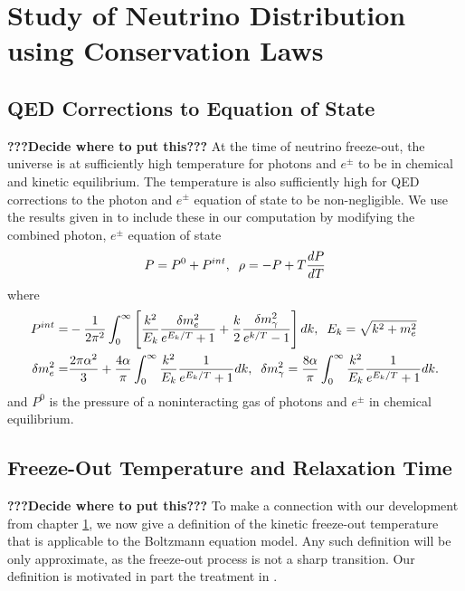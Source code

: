 \section{ Study of Neutrino Distribution using Conservation Laws}\label{ch:model_ind}


\subsection{QED Corrections to Equation of State}\label{app:QED_corr} {\bf???Decide where to put this???}
At the time of neutrino freeze-out, the universe is at sufficiently high temperature for photons and $e^\pm$ to be in chemical and kinetic equilibrium.  The temperature is also sufficiently high for QED corrections to the photon and $e^\pm$ equation of state to be non-negligible.  We use the results given in \cite{Heckler:1994tv,Mangano2002} to include these in our computation by modifying the combined photon, $e^\pm$ equation of state
\begin{align}
P=P^0+P^{int},\hspace{2mm} \rho=-P+T\frac{dP}{dT}
\end{align}
where
\begin{align}
P^{int}=&-\frac{1}{2\pi^2}\int_0^\infty\left[\frac{k^2}{E_k}\frac{\delta m_e^2}{e^{E_k/T}+1}+\frac{k}{2}\frac{\delta m_\gamma^2}{e^{k/T}-1}\right]dk,\hspace{2mm} E_k=\sqrt{k^2+m_e^2}\\
\delta m_e^2=&\frac{2\pi\alpha^2}{3}+\frac{4\alpha}{\pi}\int_0^\infty \frac{k^2}{E_k}\frac{1}{e^{E_k/T}+1}dk,\hspace{2mm} \delta m_\gamma^2=\frac{8\alpha}{\pi}\int_0^\infty \frac{k^2}{E_k}\frac{1}{e^{E_k/T}+1}dk.
\end{align}
and $P^0$ is the pressure of a noninteracting gas of photons and $e^\pm$ in chemical equilibrium.


\subsection{Freeze-Out Temperature and Relaxation Time} {\bf???Decide where to put this???}
To make a connection with our development from chapter \ref{ch:model_ind}, we now give a definition of the kinetic freeze-out temperature that is applicable to the Boltzmann equation model. Any such definition will be only approximate, as the freeze-out process is not a sharp transition.  Our definition is motivated in part the treatment in \cite{kolb}. 

